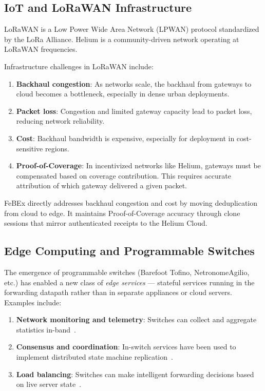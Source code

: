 \subsection{IoT and LoRaWAN Infrastructure}

LoRaWAN is a Low Power Wide Area Network (LPWAN) protocol standardized by the LoRa Alliance. Helium is a community-driven network operating at LoRaWAN frequencies.

Infrastructure challenges in LoRaWAN include:

\begin{enumerate}
    \item \textbf{Backhaul congestion}: As networks scale, the backhaul from gateways to cloud becomes a bottleneck, especially in dense urban deployments.
    \item \textbf{Packet loss}: Congestion and limited gateway capacity lead to packet loss, reducing network reliability.
    \item \textbf{Cost}: Backhaul bandwidth is expensive, especially for deployment in cost-sensitive regions.
    \item \textbf{Proof-of-Coverage}: In incentivized networks like Helium, gateways must be compensated based on coverage contribution. This requires accurate attribution of which gateway delivered a given packet.
\end{enumerate}

FeBEx directly addresses backhaul congestion and cost by moving deduplication from cloud to edge. It maintains Proof-of-Coverage accuracy through clone sessions that mirror authenticated receipts to the Helium Cloud.

\subsection{Edge Computing and Programmable Switches}

The emergence of programmable switches (Barefoot Tofino, NetronomeAgilio, etc.) has enabled a new class of \textit{edge services} --- stateful services running in the forwarding datapath rather than in separate appliances or cloud servers. Examples include:

\begin{enumerate}
    \item \textbf{Network monitoring and telemetry}: Switches can collect and aggregate statistics in-band~\cite{int}.
    \item \textbf{Consensus and coordination}: In-switch services have been used to implement distributed state machine replication~\cite{silkroad}.
    \item \textbf{Load balancing}: Switches can make intelligent forwarding decisions based on live server state~\cite{conga}.
\end{enumerate}

